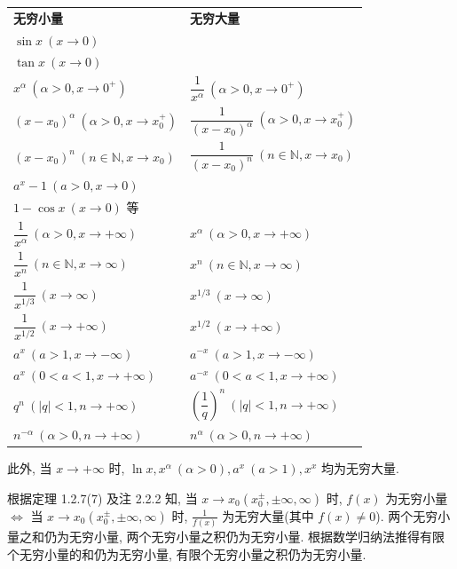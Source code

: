 \begin{example}\label{ex:2.3.1}
\begin{center}
\begin{tabular}{ll}
\quad\textbf{无穷小量} & \quad\textbf{无穷大量} \\[
1mm]
$\sin x\ (x \to 0)$ & \\
$\tan x\ (x \to 0)$ & \\
$x^\alpha\ (\alpha > 0, x \to 0^+)$ & $\dfrac{1}{x^\alpha}\ (\alpha > 0, x \to 0^+)$ \\[2.5mm]
$(x - x_0)^\alpha\ (\alpha > 0, x \to x_0^+)$ & $\dfrac{1}{(x - x_0)^\alpha}\ (\alpha > 0, x \to x_0^+)$ \\[2.5mm]
$(x - x_0)^n\ (n \in \mathbb{N}, x \to x_0)$ & $\dfrac{1}{(x - x_0)^n}\ (n \in \mathbb{N}, x \to x_0)$ \\[2.5mm]
$a^x - 1\ (a > 0, x \to 0)$ & \\
$1 - \cos x\ (x \to 0)$ 等 & \\[2.5mm]
$\dfrac{1}{x^\alpha}\ (\alpha > 0, x \to +\infty)$ & $x^\alpha\ (\alpha > 0, x \to +\infty)$ \\[2.5mm]
$\dfrac{1}{x^n}\ (n \in \mathbb{N}, x \to \infty)$ & $x^n\ (n \in \mathbb{N}, x \to \infty)$ \\[2.5mm]
$\dfrac{1}{x^{1/3}}\ (x \to \infty)$ & $x^{1/3}\ (x \to \infty)$ \\[2.5mm]
$\dfrac{1}{x^{1/2}}\ (x \to +\infty)$ & $x^{1/2}\ (x \to +\infty)$ \\[2.5mm]
$a^x\ (a > 1, x \to -\infty)$ & $a^{-x}\ (a > 1, x \to -\infty)$ \\[2.5mm]
$a^x\ (0 < a < 1, x \to +\infty)$ & $a^{-x}\ (0 < a < 1, x \to +\infty)$ \\[2.5mm]
$q^n\ (|q| < 1, n \to +\infty)$ & $\left(\dfrac{1}{q}\right)^n\ (|q| < 1, n \to +\infty)$ \\[2.5mm]
$n^{-\alpha}\ (\alpha > 0, n \to +\infty)$ & $n^\alpha\ (\alpha > 0, n \to +\infty)$
\end{tabular}
\end{center}
此外, 当 $x \to +\infty$ 时, $\ln x, x^\alpha\ (\alpha > 0), a^x\ (a > 1), x^x$ 均为无穷大量.
\end{example}
根据定理 1.2.7(7) 及注 2.2.2 知, 当 $x \to x_0(x_0^{\pm}, \pm\infty, \infty)$ 时, $f(x)$ 为无穷小量 $\iff$ 当 $x \to x_0(x_0^{\pm}, \pm\infty, \infty)$ 时, $\frac{1}{f(x)}$ 为无穷大量(其中 $f(x) \neq 0$).
两个无穷小量之和仍为无穷小量, 两个无穷小量之积仍为无穷小量. 根据数学归纳法推得有限个无穷小量的和仍为无穷小量, 有限个无穷小量之积仍为无穷小量.
